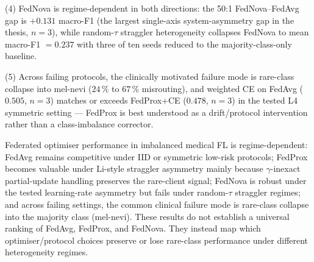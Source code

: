 \documentclass[11pt,a4paper]{report}
\begin{document}
(4) FedNova is regime-dependent in both directions: the 50:1 FedNova--FedAvg
gap is $+0.131$ macro-F1 (the largest single-axis system-asymmetry gap in
the thesis, $n=3$), while random-$\tau$ straggler heterogeneity collapses
FedNova to mean macro-F1 $= 0.237$ with three of ten seeds reduced to the
majority-class-only baseline.

(5) Across failing protocols, the clinically motivated failure mode is
rare-class collapse into mel-nevi ($24\,\%$ to $67\,\%$ misrouting), and
weighted CE on FedAvg ($0.505$, $n=3$) matches or exceeds FedProx+CE
($0.478$, $n=3$) in the tested L4 symmetric setting --- FedProx is best
understood as a drift/protocol intervention rather than a class-imbalance
corrector.

Federated optimiser performance in imbalanced medical FL is regime-dependent:
FedAvg remains competitive under IID or symmetric low-risk protocols;
FedProx becomes valuable under Li-style straggler asymmetry mainly because
$\gamma$-inexact partial-update handling preserves the rare-client signal;
FedNova is robust under the tested learning-rate asymmetry but fails under
random-$\tau$ straggler regimes; and across failing settings, the common
clinical failure mode is rare-class collapse into the majority class
(mel-nevi). These results do not establish a universal ranking of FedAvg,
FedProx, and FedNova. They instead map which optimiser/protocol choices
preserve or lose rare-class performance under different heterogeneity
regimes.


\end{document}
